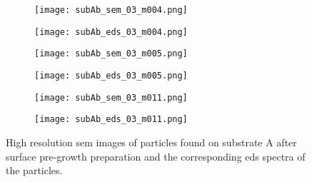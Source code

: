 \begin{figure}
    \centering
    \begin{subfigure}[t]{\textwidth}
          \begin{minipage}[t]{0.49\linewidth}
            \centering
            \texttt{[image: subAb\_sem\_03\_m004.png]}
          \end{minipage}
          \hspace{0.02\linewidth}
          \begin{minipage}[t]{0.49\linewidth}
            \centering
            \texttt{[image: subAb\_eds\_03\_m004.png]}
          \end{minipage}
        \caption{}\label{fig:add_label}
    \end{subfigure}
    \par\bigskip
    \begin{subfigure}[t]{\textwidth}
          \begin{minipage}[t]{0.49\linewidth}
            \centering
            \texttt{[image: subAb\_sem\_03\_m005.png]}
          \end{minipage}
          \hspace{0.02\linewidth}
          \begin{minipage}[t]{0.49\linewidth}
            \centering
            \texttt{[image: subAb\_eds\_03\_m005.png]}
          \end{minipage}
        \caption{}\label{fig:add_label}
    \end{subfigure}
    \par\bigskip
    \begin{subfigure}[t]{\textwidth}
          \begin{minipage}[t]{0.49\linewidth}
            \centering
            \texttt{[image: subAb\_sem\_03\_m011.png]}
          \end{minipage}
          \hspace{0.02\linewidth}
          \begin{minipage}[t]{0.49\linewidth}
            \centering
            \texttt{[image: subAb\_eds\_03\_m011.png]}
          \end{minipage}
        \caption{}\label{fig:add_label}
    \end{subfigure}
    \caption[\Ac{sem} images and \ac{eds} spectra of particles found on substrate A after surface pre-growth preparation.]{High resolution \acf{sem} images of particles found on substrate A after surface pre-growth preparation and the corresponding \acf{eds} spectra of the particles.}\label{fig:subAb_sem_w_eds}
\end{figure}


